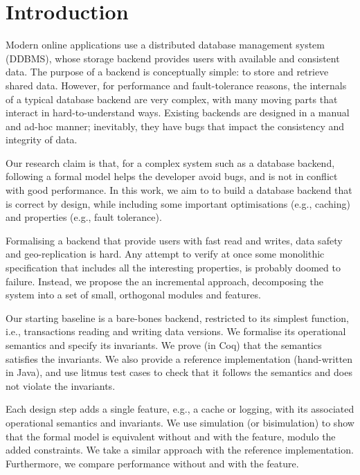 \documentclass[systeme,french,english]{compas2022}
\begin{document}

\section{Introduction}

Modern online applications use a distributed database management system
(DDBMS), whose storage backend provides users with available and
consistent data.
The purpose of a backend is conceptually simple: to store and retrieve
shared data.
However, for performance and fault-tolerance reasons, the internals of a
typical database backend are very complex, with many moving parts that interact
in hard-to-understand ways.
Existing backends are designed in a manual and ad-hoc manner;
inevitably, they have bugs that impact the consistency and integrity of
data.

Our research claim is that, for a complex system such as a database
backend, following a formal model helps the developer avoid bugs, and is
not in conflict with good performance.
In this work, we aim to to build a database backend that is correct by
design, while including some important optimisations (e.g., caching) and
properties (e.g., fault tolerance).

Formalising a backend that provide users with fast read and writes,
data safety and geo-replication is hard.
Any attempt to verify at once some monolithic specification that
includes all the interesting properties, is probably doomed to failure.
Instead, we propose the an incremental approach,  decomposing the
system into a set of small, orthogonal modules and features.

Our starting baseline is a bare-bones backend, restricted to its
simplest function, i.e., transactions reading and writing data versions.
We formalise its operational semantics and specify its invariants.
We prove (in Coq) that the semantics satisfies the invariants.
We also provide a reference implementation (hand-written in Java), and
use litmus test cases to check that it follows the semantics and does
not violate the invariants.

Each design step adds a single feature, e.g., a cache or logging,
with its associated operational semantics and invariants.
We use simulation (or bisimulation) to show that the formal model is
equivalent without and with the feature, modulo the added constraints.
We take a similar approach with the reference implementation.
Furthermore, we compare performance without and with the feature.
\end{document}
